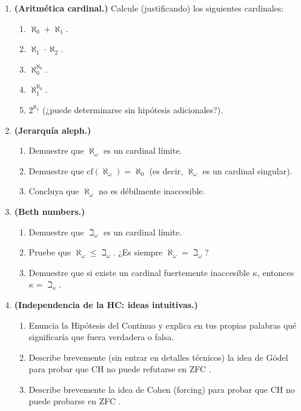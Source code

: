 \begin{enumerate}[leftmargin=2em, label=\textbf{\arabic*.}]
\item \textbf{(Aritmética cardinal.)}
Calcule (justificando) los siguientes cardinales:
\begin{enumerate}[label=(\alph*)]
  \item $\aleph_0 + \aleph_1$.
  \item $\aleph_1 \cdot \aleph_2$.
  \item $\aleph_0^{\aleph_0}$.
  \item $\aleph_1^{\aleph_0}$.
  \item $2^{\aleph_1}$ (¿puede determinarse sin hipótesis adicionales?).
\end{enumerate}

\item \textbf{(Jerarquía aleph.)}
\begin{enumerate}[label=(\alph*)]
  \item Demuestre que $\aleph_\omega$ es un cardinal límite.
  \item Demuestre que $\mathrm{cf}(\aleph_\omega) = \aleph_0$ (es decir, $\aleph_\omega$ es un cardinal singular).
  \item Concluya que $\aleph_\omega$ no es débilmente inaccesible.
\end{enumerate}

\item \textbf{(Beth numbers.)}
\begin{enumerate}[label=(\alph*)]
  \item Demuestre que $\beth_\omega$ es un cardinal límite.
  \item Pruebe que $\aleph_\omega \leq \beth_\omega$. ¿Es siempre $\aleph_\omega = \beth_\omega$?
  \item Demuestre que si existe un cardinal fuertemente inaccesible $\kappa$, entonces $\kappa = \beth_\kappa$.
\end{enumerate}

\item \textbf{(Independencia de la HC: ideas intuitivas.)}
\begin{enumerate}[label=(\alph*)]
  \item Enuncia la Hipótesis del Continuo y explica en tus propias palabras qué significaría que fuera verdadera o falsa.
  \item Describe brevemente (sin entrar en detalles técnicos) la idea de Gödel para probar que CH no puede refutarse en ZFC \cite{godel1940}.
  \item Describe brevemente la idea de Cohen (forcing) para probar que CH no puede probarse en ZFC \cite{cohen1966}.
\end{enumerate}


\end{enumerate}
